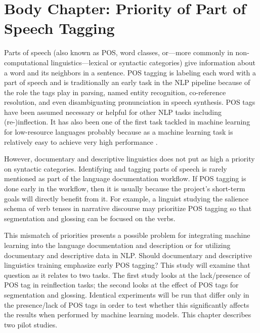 \section{Body Chapter: Priority of Part of Speech Tagging}
\label{sec:POS}

Parts of speech (also known as POS, word classes, or---more commonly in non-computational linguistics---lexical or syntactic categories) give information about a word and its neighbors in a sentence. POS tagging is labeling each word with a part of speech and is traditionally an early task in the NLP pipeline because of the role the tags play in parsing, named entity recognition, co-reference resolution, and even disambiguating pronunciation in speech synthesis. POS tags have been assumed necessary or helpful for other NLP tasks including (re-)inflection. It has also been one of the first task tackled in machine learning for low-resource languages probably because as a machine learning task is relatively easy to achieve very high performance \citep{cox_probabilistic_2010,de_pauw_resource-light_2012,baldridge_learning_2013,duong_natural_2017,anastasopoulos_computational_2019,millour_unsupervised_2019}. 

However, documentary and descriptive linguistics does not put as high a priority on syntactic categories. Identifying and tagging parts of speech is rarely mentioned as part of the language documentation workflow. If POS tagging is done early in the workflow, then it is usually because the project's short-term goals will directly benefit from it. For example, a linguist studying the salience schema of verb tenses in narrative discourse may prioritize POS tagging so that segmentation and glossing can be focused on the verbs. 

This mismatch of priorities presents a possible problem for integrating machine learning into the language documentation and description or for utilizing documentary and descriptive data in NLP. Should documentary and descriptive linguistics training emphasize early POS tagging? 
This study will examine that question as it relates to two tasks. The first study looks at the lack/presence of POS tag in reinflection tasks; the second looks at the effect of POS tags for segmentation and glossing. Identical experiments will be run that differ only in the presence/lack of POS tags in order to test whether this significantly affects the results when performed by machine learning models. This chapter describes two pilot studies. 

